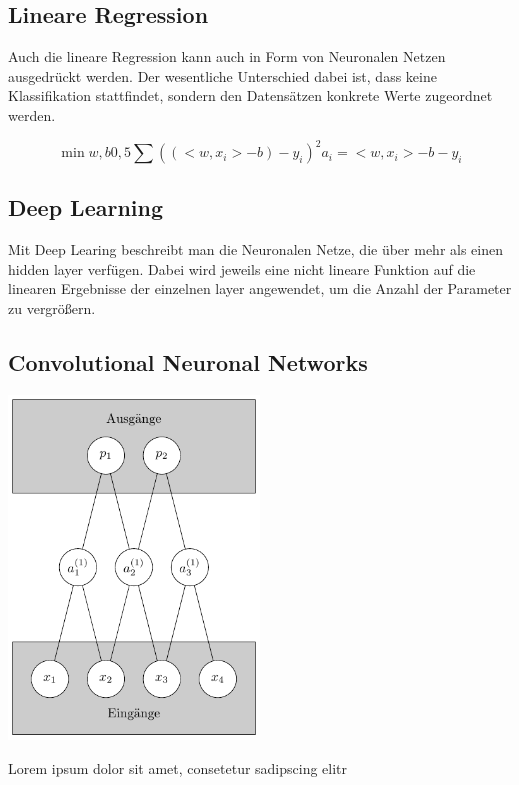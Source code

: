 \subsection{Lineare Regression}

Auch die lineare Regression kann auch in Form von Neuronalen Netzen ausgedrückt werden. Der wesentliche Unterschied dabei ist, dass keine Klassifikation stattfindet, sondern den Datensätzen konkrete Werte zugeordnet werden.

\begin{equation*}
\min\limits{w,b} 0,5 \sum ((<w,x_i> - b) -y_i)^2
a_i = <w,x_i> -b-y_i
\end{equation*}

\subsection{Deep Learning}

Mit Deep Learing beschreibt man die Neuronalen Netze, die über mehr als einen hidden layer verfügen. Dabei wird jeweils eine nicht lineare Funktion auf die linearen Ergebnisse der einzelnen layer angewendet, um die Anzahl der Parameter zu vergrößern.

\subsection{Convolutional Neuronal Networks}

\begin{dsafigure}
	\begin{center}
		\includegraphics[width=0.5\textwidth]{Figure_ConvNN}
		\caption{Lorem ipsum dolor sit amet, consetetur sadipscing elitr} %
		\label{FigConvNN}
	\end{center}
\end{dsafigure}